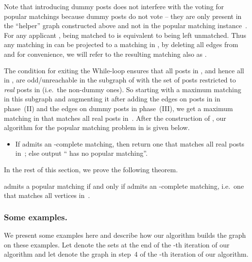 \documentclass[11pt]{llncs}
\begin{document}
Note that
introducing dummy posts does not interfere with the voting for popular matchings because 
dummy posts do not vote -- they are only present in the 
``helper'' graph  constructed above and not in the popular matching instance~. For any
applicant , being matched to  is equivalent to  being left unmatched. Thus any 
matching  in  can be projected to a matching in , by deleting all  
edges from  and for convenience, we will refer to the resulting matching also as .


The condition for exiting the While-loop ensures that all posts in , and hence 
all in , are odd/unreachable in the subgraph of  with the set of posts 
restricted to {\em real} posts in  (i.e.\ the non-dummy ones). So starting 
with a maximum matching in this subgraph and augmenting it after adding the edges on 
posts in  in phase~(II) and the edges on dummy posts in phase~(III), we get a maximum matching 
in  that matches all real posts in~. After the construction of , our 
algorithm for the popular matching problem in  is given below.
\begin{itemize}
\item If  admits an -complete matching, then return one that matches all real posts 
in~; else output `` has no popular matching''.
\end{itemize}


In the rest of this section, we prove the following theorem.

\begin{theorem} 
\label{thm:correctness}
 admits a popular matching if and only if  admits an -complete matching, i.e.\ one 
that matches all vertices in~.
\end{theorem}


\subsubsection{Some examples.}

We present some examples here and describe how our algorithm builds the graph  on these examples. 
Let  denote the sets 
 at the end of the -th iteration of our algorithm and let  denote
the graph  in step~4 of the -th iteration of our algorithm.
\end{document}
